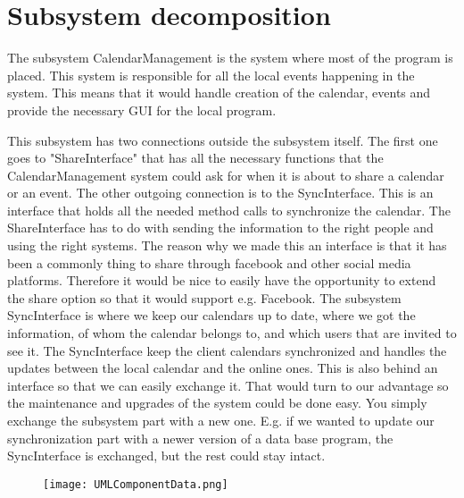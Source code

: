 \section{Subsystem decomposition}
The subsystem CalendarManagement is the system where most of the program is placed. This system is responsible for all the local events happening in the system. This means that it would handle creation of the calendar, events and provide the necessary GUI for the local program. 

This subsystem has two connections outside the subsystem itself. The first one goes to "ShareInterface" that has all the necessary functions that the CalendarManagement system could ask for when it is about to share a calendar or an event. The other outgoing connection is to the SyncInterface. This is an interface that holds all the needed method calls to synchronize the calendar.
\newline
\newline
The ShareInterface has to do with sending the information to the right people and using the right systems. The reason why we made this an interface is that it has been a commonly thing to share through facebook and other social media platforms. Therefore it would be nice to easily have the opportunity to extend the share option so that it would support e.g. Facebook. 
\newline
\newline
The subsystem SyncInterface is where we keep our calendars up to date, where we got the information, of whom the calendar belongs to, and which users that are invited to see it. The SyncInterface keep the client calendars synchronized and handles the updates between the local calendar and the online ones. This is also behind an interface so that we can easily exchange it. That would turn to our advantage so the maintenance and upgrades of the system could be done easy. You simply exchange the subsystem part with a new one. E.g. if we wanted to update our synchronization part with a newer version of a data base program, the SyncInterface is exchanged, but the rest could stay intact. 
\newline
\begin{figure}[h]
\centering
\texttt{[image: UMLComponentData.png]}
\label{figur:UMLComponentData}
\end{figure}